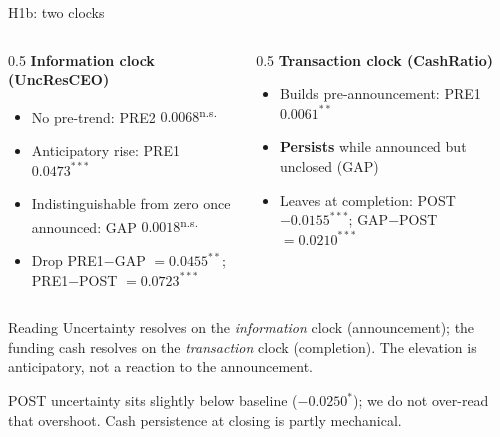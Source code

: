 \documentclass[aspectratio=169, 11pt]{beamer}
\newcommand{\ns}{\textsuperscript{n.s.}}
\begin{document}
\begin{frame}{H1b: two clocks}
  \begin{columns}[T]
    \begin{column}{0.5\textwidth}
      \textbf{\textcolor{cashblue}{Information clock} (UncResCEO)}
      \begin{itemize}
        \item No pre-trend: PRE2 $0.0068$\ns
        \item Anticipatory rise: PRE1 $0.0473^{***}$
        \item \alert{Indistinguishable from zero once announced}: GAP $0.0018$\ns
        \item Drop PRE1$-$GAP $=0.0455^{**}$; PRE1$-$POST $=0.0723^{***}$
      \end{itemize}
    \end{column}
    \begin{column}{0.5\textwidth}
      \textbf{\textcolor{stockorange}{Transaction clock} (CashRatio)}
      \begin{itemize}
        \item Builds pre-announcement: PRE1 $0.0061^{**}$
        \item \textbf{Persists} while announced but unclosed (GAP)
        \item Leaves at completion: POST $-0.0155^{***}$;
          GAP$-$POST $=0.0210^{***}$
      \end{itemize}
    \end{column}
  \end{columns}
  \vspace{0.4em}
  \begin{block}{Reading}
    Uncertainty resolves on the \emph{information} clock (announcement); the
    funding cash resolves on the \emph{transaction} clock (completion). The
    elevation is anticipatory, not a reaction to the announcement.
  \end{block}
  \vspace{0.1em}
  {\scriptsize\color{mutedgray} POST uncertainty sits slightly below baseline
  ($-0.0250^{*}$); we do not over-read that overshoot. Cash persistence at
  closing is partly mechanical.}
\end{frame}
\end{document}
